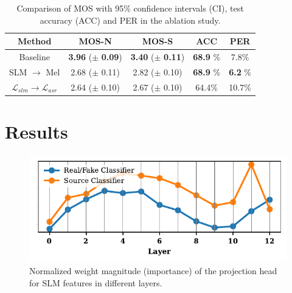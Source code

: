 \documentclass{article}
\begin{document}
\begin{sloppy}
 
\begin{table}[!t]
    \vspace{-0.2cm} 

	\centering
	\caption{Comparison of MOS with 95\% confidence intervals (CI), test accuracy (ACC) and PER in the ablation study. \\ } 
 \begin{adjustbox}{width=\columnwidth,center}
    \begin{tabular}{c|c|c|c|c}
    \hline
    Method & MOS-N & MOS-S & ACC & PER \\
    \hline
    Baseline      &  \textbf{3.96} ($\pm$ \textbf{0.09})  &  \textbf{3.40} ($\pm$ \textbf{0.11}) & \textbf{68.9} \%  &7.8\% \\
    SLM $\rightarrow$ Mel   & 2.68 ($\pm$ 0.11)  & 2.82 ($\pm$ 0.10) & \textbf{68.9} \%  & \textbf{6.2} \%\\
     $\mathcal{L}_{slm} \rightarrow \mathcal{L}_{asr}$ & 2.64 ($\pm$ 0.10)  & 2.67 ($\pm$ 0.10) &64.4\%  &10.7\%\\
    \hline
    \end{tabular}
    \end{adjustbox}
    \vspace{-0.2cm} 

    \label{tab:3}
    
\end{table}
\section{Results}
\begin{figure}
    \centering
    \includegraphics[width=\columnwidth]{fig2.pdf}
    \vspace{-0.7cm} 
    \caption{Normalized weight magnitude (importance) of the projection head for SLM features in different layers.}
    \label{fig:my_label}
    \vspace{-0.4cm} 


\end{figure}
\end{sloppy}
\end{document}
